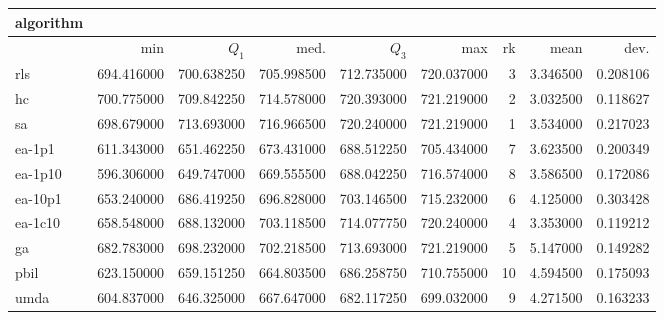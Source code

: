 \begin{tabular}{@{}l*{5}{>{{}}N{3}{2}}>{{}}N{2}{0}>{{}}N{1}{2}>{{}}N{1}{2}@{}}
\toprule
{algorithm} &  &  \\
\midrule
& {min} & {$Q_1$} & {med.} & {$Q_3$} & {max} & {rk} & {mean} & {dev.} \\
\midrule
rls & 694.416000 & 700.638250 & 705.998500 & 712.735000 & 720.037000 & 3 & 3.346500 & 0.208106 \\
 hc & {\color{blue}} 700.775000 & 709.842250 & 714.578000 & {\color{blue}} 720.393000 & {\color{blue}} 721.219000 & 2 & 3.032500 & 0.118627 \\
 sa & 698.679000 & {\color{blue}} 713.693000 & {\color{blue}} 716.966500 & 720.240000 & {\color{blue}} 721.219000 & 1 & 3.534000 & 0.217023 \\
 ea-1p1 & 611.343000 & 651.462250 & 673.431000 & 688.512250 & 705.434000 & 7 & 3.623500 & 0.200349 \\
 ea-1p10 & 596.306000 & 649.747000 & 669.555500 & 688.042250 & 716.574000 & 8 & 3.586500 & 0.172086 \\
 ea-10p1 & 653.240000 & 686.419250 & 696.828000 & 703.146500 & 715.232000 & 6 & 4.125000 & 0.303428 \\
 ea-1c10 & 658.548000 & 688.132000 & 703.118500 & 714.077750 & 720.240000 & 4 & 3.353000 & 0.119212 \\
 ga & 682.783000 & 698.232000 & 702.218500 & 713.693000 & {\color{blue}} 721.219000 & 5 & 5.147000 & 0.149282 \\
 pbil & 623.150000 & 659.151250 & 664.803500 & 686.258750 & 710.755000 & 10 & 4.594500 & 0.175093 \\
 umda & 604.837000 & 646.325000 & 667.647000 & 682.117250 & 699.032000 & 9 & 4.271500 & 0.163233 \\
 \bottomrule
\end{tabular}
